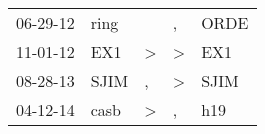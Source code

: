 \begin{supertabular}{p{0.07\textwidth}p{0.06\textwidth}p{0.02\textwidth}p{0.02\textwidth}p{0.06\textwidth}}
 06-29-12\textsuperscript{} &  ring\textsuperscript{} &               &             , &  ORDE\textsuperscript{} \\
 11-01-12\textsuperscript{} &   EX1\textsuperscript{} &  \textgreater &  \textgreater &   EX1\textsuperscript{} \\
 08-28-13\textsuperscript{} &  SJIM\textsuperscript{} &             , &  \textgreater &  SJIM\textsuperscript{} \\
 04-12-14\textsuperscript{} &  casb\textsuperscript{} &  \textgreater &             , &   h19\textsuperscript{} \\
\end{supertabular}
